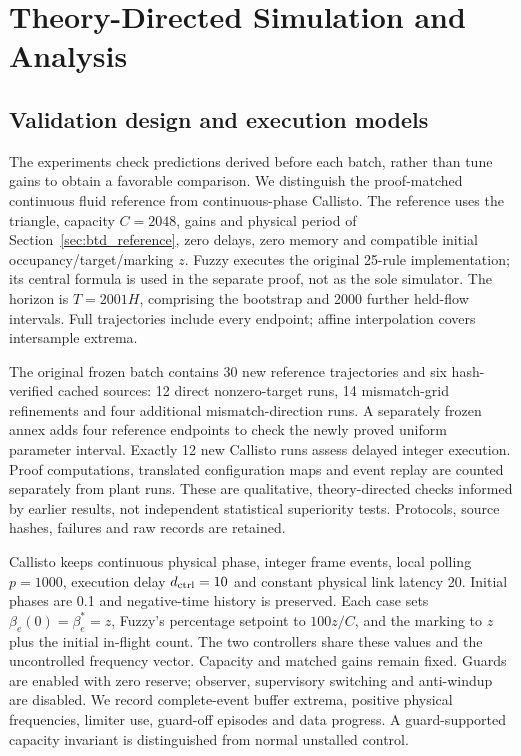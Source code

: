 \section{Theory-Directed Simulation and Analysis}
\label{sec:evaluation}

\subsection{Validation design and execution models}
The experiments check predictions derived before each batch, rather
than tune gains to obtain a favorable comparison. We distinguish
the proof-matched continuous fluid reference from continuous-phase
Callisto. The reference uses the triangle, capacity $C=2048$, gains
and physical period of Section~\ref{sec:btd_reference}, zero delays,
zero memory and compatible initial occupancy/target/marking $z$.
Fuzzy executes the original 25-rule implementation; its central
formula is used in the separate proof, not as the sole simulator.
The horizon is $T=2001H$, comprising the bootstrap and 2000 further
held-flow intervals. Full trajectories include every endpoint;
affine interpolation covers intersample extrema.

The original frozen batch contains 30 new reference trajectories
and six hash-verified cached sources: 12 direct nonzero-target runs,
14 mismatch-grid refinements and four additional mismatch-direction
runs. A separately frozen annex adds four reference endpoints to
check the newly proved uniform parameter interval. Exactly 12 new
Callisto runs assess delayed integer execution. Proof computations,
translated configuration maps and event replay are counted separately
from plant runs. These are qualitative, theory-directed checks informed
by earlier results, not independent statistical superiority tests.
Protocols, source hashes, failures and raw records are retained.

Callisto keeps continuous physical phase, integer frame events,
local polling $p=1000$, execution delay $d_{\rm ctrl}=10$ and constant
physical link latency 20. Initial phases are 0.1 and negative-time
history is preserved. Each case sets $\beta_e(0)=\beta_e^*=z$,
Fuzzy's percentage setpoint to $100z/C$, and the marking to $z$ plus
the initial in-flight count. The two controllers share these values
and the uncontrolled frequency vector. Capacity and matched gains
remain fixed. Guards are enabled with zero reserve; observer,
supervisory switching and anti-windup are disabled. We record
complete-event buffer extrema, positive physical frequencies,
limiter use, guard-off episodes and data progress. A guard-supported
capacity invariant is distinguished from normal unstalled control.

